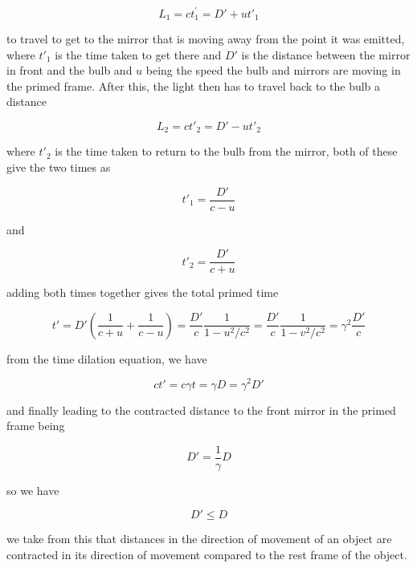 \begin{equation}
	L_1= c{t}_1^{'}= D{'} + ut{'}_1
\end{equation}

to travel to get to the mirror that is moving away from the point it was emitted, where $t{'}_1$ is the time taken to get there and $D{'}$ is the distance between the mirror in front and the bulb and $u$ being the speed the bulb and mirrors are moving in the primed frame. After this, the light then has to travel back to the bulb a distance

\begin{equation}
	L_2 = ct{'}_2= D{'} - ut{'}_2
\end{equation}

where $t{'}_2$ is the time taken to return to the bulb from the mirror, both of these give the two times as

\begin{equation}
	t{'}_1=\frac{D'}{c-u}
\end{equation}

and

\begin{equation}
	t{'}_2=\frac{D'}{c+u}
\end{equation}

adding both times together gives the total primed time

\begin{equation}
	t{'} = D{'}(\frac{1}{c+u} + \frac{1}{c-u})=\frac{D'}{c}\frac{1}{1-u^2/c^2} =\frac{D'}{c}\frac{1}{1-v^2/c^2}={\gamma}^2 \frac{D'}{c}
\end{equation}

from the time dilation equation, we have

\begin{equation}
	ct{'}=c{\gamma} t = {\gamma} D = {\gamma}^2 D{'}
\end{equation}

and finally leading to the contracted distance to the front mirror in the primed frame being

\begin{equation}
	D{'} = \frac{1}{{\gamma}}D
\end{equation}

so we have

\begin{equation}
	D{'} \leq D
\end{equation}

we take from this that distances in the direction of movement of an object are contracted in its direction of movement compared to the rest frame of the object.

